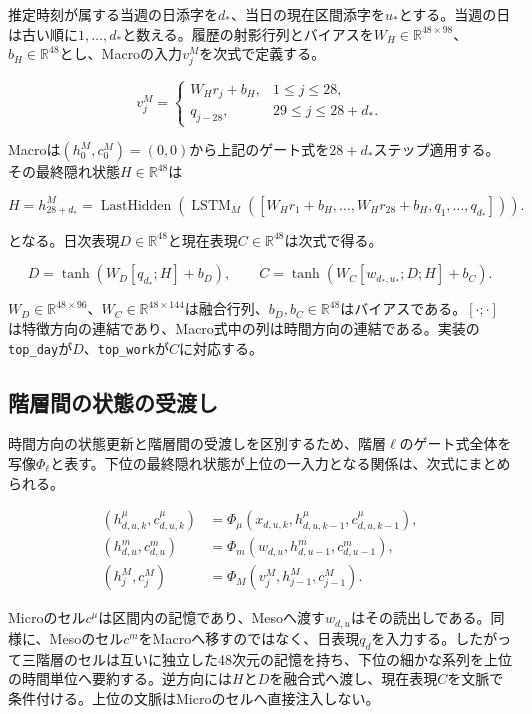 推定時刻が属する当週の日添字を\(d_*\)、当日の現在区間添字を\(u_*\)とする。当週の日は古い順に\(1,\ldots,d_*\)と数える。履歴の射影行列とバイアスを\(W_H\in\mathbb R^{48\times98}\)、\(b_H\in\mathbb R^{48}\)とし、Macroの入力\(v_j^M\)を次式で定義する。

\[
v_j^M=
\begin{cases}
W_Hr_j+b_H,&1\le j\le28,\\
q_{j-28},&29\le j\le28+d_*.
\end{cases}
\]

Macroは\((h^M_0,c^M_0)=(0,0)\)から上記のゲート式を\(28+d_*\)ステップ適用する。その最終隠れ状態\(H\in\mathbb R^{48}\)は

\[
H=h^M_{28+d_*}
=\operatorname{LastHidden}\left(\operatorname{LSTM}_{M}
\left([W_Hr_1+b_H,\ldots,W_Hr_{28}+b_H,q_1,\ldots,q_{d_*}]\right)\right).
\]

となる。日次表現\(D\in\mathbb R^{48}\)と現在表現\(C\in\mathbb R^{48}\)は次式で得る。

\[
D=\tanh(W_D[q_{d_*};H]+b_D),\qquad
C=\tanh(W_C[w_{d_*,u_*};D;H]+b_C).
\]

\(W_D\in\mathbb R^{48\times96}\)、\(W_C\in\mathbb R^{48\times144}\)は融合行列、\(b_D,b_C\in\mathbb R^{48}\)はバイアスである。\([\cdot;\cdot]\)は特徴方向の連結であり、Macro式中の列は時間方向の連結である。実装の\texttt{top\_day}が\(D\)、\texttt{top\_work}が\(C\)に対応する。

\subsection{階層間の状態の受渡し}

時間方向の状態更新と階層間の受渡しを区別するため、階層\(\ell\)のゲート式全体を写像\(\Phi_\ell\)と表す。下位の最終隠れ状態が上位の一入力となる関係は、次式にまとめられる。

\[
\begin{aligned}
(h^\mu_{d,u,k},c^\mu_{d,u,k})
&=\Phi_\mu(x_{d,u,k},h^\mu_{d,u,k-1},c^\mu_{d,u,k-1}),\\
(h^m_{d,u},c^m_{d,u})
&=\Phi_m(w_{d,u},h^m_{d,u-1},c^m_{d,u-1}),\\
(h^M_j,c^M_j)
&=\Phi_M(v_j^M,h^M_{j-1},c^M_{j-1}).
\end{aligned}
\]

Microのセル\(c^\mu\)は区間内の記憶であり、Mesoへ渡す\(w_{d,u}\)はその読出しである。同様に、Mesoのセル\(c^m\)をMacroへ移すのではなく、日表現\(q_d\)を入力する。したがって三階層のセルは互いに独立した48次元の記憶を持ち、下位の細かな系列を上位の時間単位へ要約する。逆方向には\(H\)と\(D\)を融合式へ渡し、現在表現\(C\)を文脈で条件付ける。上位の文脈はMicroのセルへ直接注入しない。

